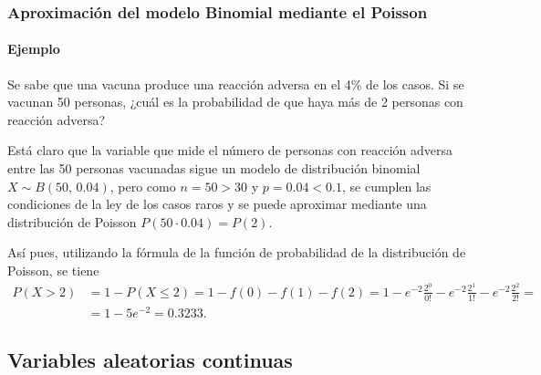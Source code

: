 \begin{frame}
\frametitle{Aproximación del modelo Binomial mediante el Poisson}
\framesubtitle{Ejemplo}
Se sabe que una vacuna produce una reacción adversa en el 4\% de los casos. Si se vacunan 50 personas, ¿cuál es la probabilidad de que haya
más de 2 personas con reacción adversa?

Está claro que la variable que mide el número de personas con reacción adversa entre las 50 personas vacunadas sigue un modelo de
distribución binomial $X\sim B(50,\,0.04)$, pero como $n=50>30$ y $p=0.04<0.1$, se cumplen las condiciones de la ley de los casos raros y se
puede aproximar mediante una distribución de Poisson $P(50\cdot 0.04)=P(2)$.

Así pues, utilizando la fórmula de la función de probabilidad de la distribución de Poisson, se tiene
\begin{align*}
P(X>2) &= 1 -P(X\leq 2) = 1-f(0)-f(1)-f(2) = 1-e^{-2}\frac{2^0}{0!}-e^{-2}\frac{2^1}{1!}-e^{-2}\frac{2^2}{2!} =\\
&= 1-5e^{-2} = 0.3233.
\end{align*}

\end{frame}


\subsection{Variables aleatorias continuas}

